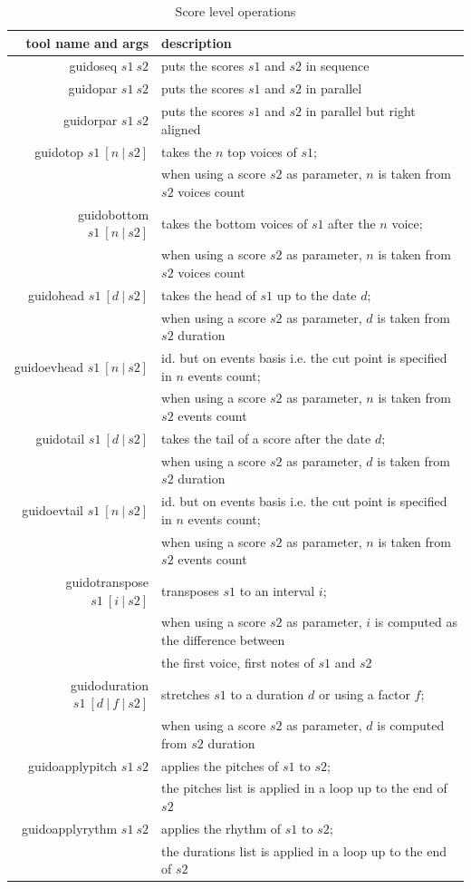\documentclass[twoside,10pt,a4paper]{article}
\begin{document}
\begin{table}[htdp]
\caption{Score level operations}
\begin{center}
\begin{tabular}{rl}
tool name and args		&	description \\
\hline
guidoseq $s1\ s2$		& puts the scores $s1$ and $s2$ in sequence \\
guidopar $s1\ s2$		& puts the scores $s1$ and $s2$ in parallel \\ 
guidorpar $s1\ s2$		& puts the scores $s1$ and $s2$ in parallel but right aligned \\
guidotop $s1\ [n\ | \ s2]$ 	& takes the $n$ top voices of $s1$; \\
					& when using a score $s2$ as parameter, $n$ is taken from $s2$ voices count \\
guidobottom $s1\ [n\ | \ s2]$ 	& takes the bottom voices of $s1$ after the $n$ voice;  \\
					& when using a score $s2$ as parameter, $n$ is taken from $s2$ voices count \\
guidohead	$s1\ [d\ | \ s2]$	& takes the head of $s1$ up to the date $d$; \\
				& when using a score $s2$ as parameter, $d$ is taken from $s2$ duration \\
guidoevhead $s1\ [n\ | \ s2]$	& id. but on events basis i.e. the cut point is specified in $n$ events count; \\
				& when using a score $s2$ as parameter, $n$ is taken from $s2$ events count \\
guidotail	$s1\ [d\ | \ s2]$ 	& takes the tail of a score after the date $d$; \\
				& when using a score $s2$ as parameter, $d$ is taken from $s2$ duration \\
guidoevtail $s1\ [n\ | \ s2]$ 	& id. but on events basis i.e. the cut point is specified in $n$ events count; \\
				& when using a score $s2$ as parameter, $n$ is taken from $s2$ events count \\
guidotranspose $s1\ [i\ | \ s2]$	& transposes $s1$ to an interval $i$; \\
				& when using a score $s2$ as parameter, $i$ is computed as the difference between \\
				& the first voice, first notes of $s1$ and $s2$ \\
guidoduration $s1\ [d\ |\ f\ |\ s2]$	& stretches $s1$ to a duration $d$ or using a factor $f$; \\
				& when using a score $s2$ as parameter, $d$ is computed from $s2$ duration \\
guidoapplypitch $s1\ s2$	& applies the pitches of $s1$ to $s2$; \\
				& the pitches list is applied in a loop up to the end of $s2$ \\
guidoapplyrythm $s1\ s2$	& applies the rhythm of $s1$ to $s2$; \\
				& the durations list is applied in a loop up to the end of $s2$ \\
\hline
\end{tabular}
\end{center}
\label{operations}
\end{table}
\end{document}
